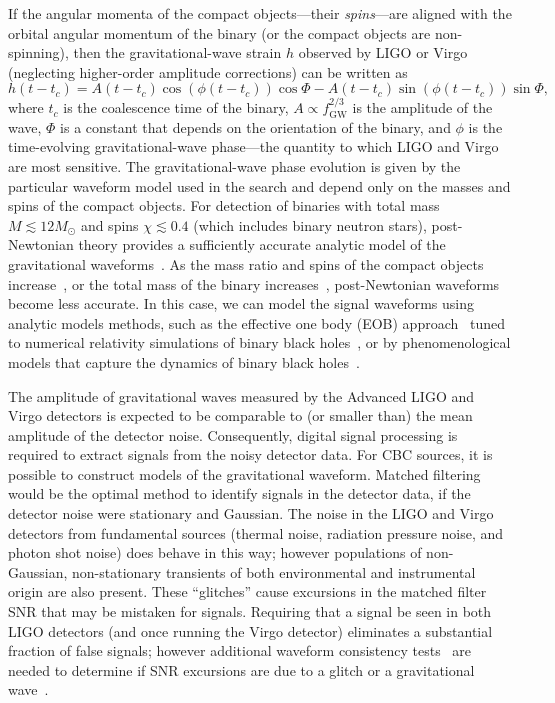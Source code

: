 If the angular momenta of the compact objects---their \emph{spins}---are
aligned with the orbital angular momentum of the binary (or the compact
objects are non-spinning), then the gravitational-wave strain $h$ observed by
LIGO or Virgo  (neglecting higher-order amplitude corrections) can be written as
\begin{equation}
h(t-t_c) = A(t - t_c) \cos( \phi(t - t_c) ) \cos \Phi - A(t - t_c) \sin( \phi(t - t_c) ) \sin \Phi,
\end{equation}
where $t_{c}$ is the coalescence time of the binary, $A \propto f_\mathrm{GW}^{2/3}$ is
the amplitude of the wave, $\Phi$ is a constant that depends on the
orientation of the binary, and $\phi$ is the time-evolving gravitational-wave
phase---the quantity to which LIGO and Virgo are most sensitive. The
gravitational-wave phase evolution is given by the particular waveform model
used in the search and depend only on the masses and spins of the compact
objects.  For detection of binaries with total mass $M \lesssim 12 M_\odot$ and spins $\chi
\lesssim 0.4$ (which includes binary neutron stars),  post-Newtonian theory
provides a sufficiently accurate analytic model of the gravitational
waveforms~\cite{Blanchet:2013haa,kidder:821,PhysRevD.47.R4183,Buonanno:2009zt,Brown:2012nn,Brown:2012qf}.
As the mass ratio and spins of the compact objects
increase~\cite{Brown:2012qf}, or the total mass of the binary
increases~\cite{Buonanno:2009zt,Brown:2012nn}, post-Newtonian waveforms 
become less accurate. In this case, we can model the signal
waveforms using analytic models methods, such as the effective one body (EOB)
approach~\cite{BuonannoDamour:1999} tuned to numerical relativity simulations of binary black holes~\cite{Taracchini:2013rva}, or by phenomenological models that capture the
dynamics of binary black holes~\cite{Hannam:2013oca,Purrer:2014fza}.

The amplitude of gravitational waves measured by the Advanced LIGO and Virgo detectors
is expected to be comparable to (or smaller than) the mean amplitude of the
detector noise.  Consequently, digital signal processing is required to
extract signals from the noisy detector data. For \ac{CBC} sources, it is
possible to construct models of the gravitational waveform. Matched
filtering~\cite{Wainstein:1962} would be the optimal method to identify
signals in the detector data, if the detector noise were stationary and
Gaussian. The noise in the LIGO and Virgo detectors from fundamental sources (thermal noise, radiation pressure noise, and photon shot noise) does behave in this way; however
populations of non-Gaussian, non-stationary transients of both environmental
and instrumental origin are also present. These ``glitches'' cause excursions in
the matched filter \ac{SNR} that may be mistaken for signals. Requiring that a
signal be seen in both LIGO detectors (and once running the Virgo detector) eliminates a substantial fraction of
false signals; however additional waveform consistency tests~\cite{Allen:2004}
are needed to determine if \ac{SNR} excursions are due to a glitch or a
gravitational wave~\cite{Babak:2012zx}. 
 

